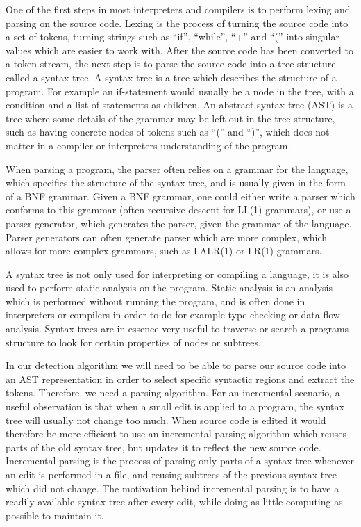 One of the first steps in most interpreters and compilers is to perform lexing and parsing
on the source code. Lexing is the process of turning the source code into a set of tokens,
turning strings such as ``if'', ``while'', ``+'' and ``('' into singular values which are
easier to work with. After the source code has been converted to a token-stream, the next
step is to parse the source code into a tree structure called a syntax tree. A syntax tree
is a tree which describes the structure of a program. For example an if-statement would
usually be a node in the tree, with a condition and a list of statements as children. An
abstract syntax tree (AST) is a tree where some details of the grammar may be left out in
the tree structure, such as having concrete nodes of tokens such as ``('' and ``)'', which
does not matter in a compiler or interpreters understanding of the program.

When parsing a program, the parser often relies on a grammar for the language, which
specifies the structure of the syntax tree, and is usually given in the form of a BNF
grammar. Given a BNF grammar, one could either write a parser which conforms to this
grammar (often recursive-descent for LL(1) grammars), or use a parser generator, which
generates the parser, given the grammar of the language. Parser generators can often
generate parser which are more complex, which allows for more complex grammars, such as
LALR(1) or LR(1) grammars.

A syntax tree is not only used for interpreting or compiling a language, it is also used
to perform static analysis on the program. Static analysis is an analysis which is
performed without running the program, and is often done in interpreters or compilers in
order to do for example type-checking or data-flow analysis. Syntax trees are in essence
very useful to traverse or search a programs structure to look for certain properties of
nodes or subtrees. 

In our detection algorithm we will need to be able to parse our source code into an AST
representation in order to select specific syntactic regions and extract the tokens.
Therefore, we need a parsing algorithm. For an incremental scenario, a useful observation
is that when a small edit is applied to a program, the syntax tree will usually not change
too much. When source code is edited it would therefore be more efficient to use an
incremental parsing algorithm which reuses parts of the old syntax tree, but updates it to
reflect the new source code. Incremental parsing is the process of parsing only parts of a
syntax tree whenever an edit is performed in a file, and reusing subtrees of the previous
syntax tree which did not change. The motivation behind incremental parsing is to have a
readily available syntax tree after every edit, while doing as little computing as
possible to maintain it.

